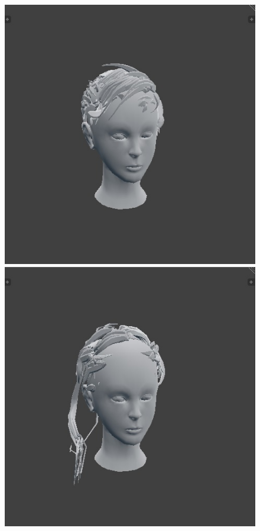 \documentclass[ %
author={Dillon Keith Diep},
supervisor={Dr. Carl Henrik Ek},
degree={MEng},
title={ART-CG Hair:},
subtitle={Assisted Real-time Content Generation of Stylised Virtual Hair},
type={Research},
year={2017} ]{dissertation}
\begin{document}
\begin{figure}[!h]
	\includegraphics[scale=0.25]{images/outputMesh7}
	\includegraphics[scale=0.25]{images/outputMesh8}\\

\end{figure}
\end{document}
